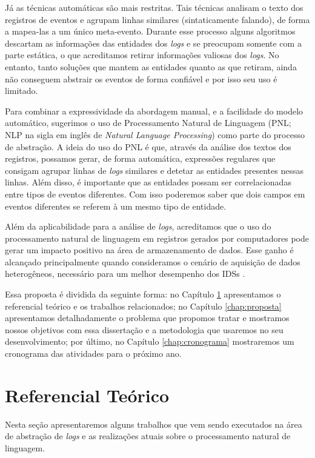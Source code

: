 \documentclass[
	12pt,				%
	openright,			%
	twoside,			%
	a4paper,			%
	english,			%
	spanish,			%
	brazil,				%
	]{abntex2}
\begin{document}
Já as técnicas automáticas são mais restritas. Tais técnicas analisam o texto dos registros de eventos e agrupam linhas similares (sintaticamente falando), de forma a mapea-las a um único meta-evento. Durante esse processo alguns algoritmos descartam as informações das entidades dos \emph{logs} e se preocupam somente com a parte estática, o que acreditamos retirar informações valiosas dos \emph{logs}. No entanto, tanto soluções que mantem as entidades quanto as que retiram, ainda não conseguem abstrair os eventos de forma confiável e por isso seu uso é limitado.

Para combinar a expressividade da abordagem manual, e a facilidade do modelo automático, sugerimos o uso de Processamento Natural de Linguagem (PNL; NLP na sigla em inglês de \emph{Natural Language Processing}) como parte do processo de abstração. A ideia do uso do PNL é que, através da análise dos textos dos registros, possamos gerar, de forma automática, expressões regulares que consigam agrupar linhas de \emph{logs} similares e detetar as entidades presentes nessas linhas. Além disso, é importante que as entidades possam ser correlacionadas entre tipos de eventos diferentes. Com isso poderemos saber que dois campos em eventos  diferentes se referem à um mesmo tipo de entidade.

Além da aplicabilidade para a análise de \emph{logs}, acreditamos que o uso do processamento natural de linguagem em registros gerados por computadores pode gerar um impacto positivo na área de armazenamento de dados. Esse ganho é alcançado principalmente quando consideramos o cenário de aquisição de dados heterogêneos, necessário para um melhor desempenho dos IDSs \cite{zuech2015intrusion}.

Essa proposta é dividida da seguinte forma: no Capítulo \ref{chap:referencial} apresentamos o referencial teórico e os trabalhos relacionados; no Capítulo \ref{chap:proposta} apresentamos detalhadamente o problema que propomos tratar e mostramos nossos objetivos com essa dissertação e a metodologia que usaremos no seu desenvolvimento; por último, no Capítulo \ref{chap:cronograma} mostraremos um cronograma das atividades para o próximo ano.

\chapter{Referencial Teórico}\label{chap:referencial}

Nesta seção apresentaremos alguns trabalhos que vem sendo executados na área de abstração de \emph{logs} e as realizações atuais sobre o processamento natural de linguagem.
\end{document}
